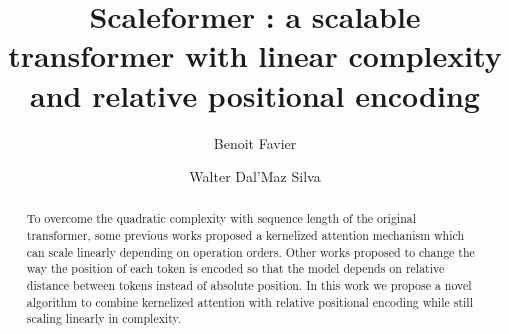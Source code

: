 \documentclass[lettersize,journal]{IEEEtran}
\begin{document}
\title{Scaleformer : a scalable transformer with linear complexity and relative positional encoding}

\author[1]{Benoit Favier}
\author[2]{Walter Dal'Maz Silva}


\maketitle

\begin{abstract}
To overcome the quadratic complexity with sequence length of the original transformer, some previous works proposed a kernelized attention mechanism which can scale linearly depending on operation orders. Other works proposed to change the way the position of each token is encoded so that the model depends on relative distance between tokens instead of absolute position. In this work we propose a novel algorithm to combine kernelized attention with relative positional encoding while still scaling linearly in complexity.
\end{abstract}
















\end{document}
